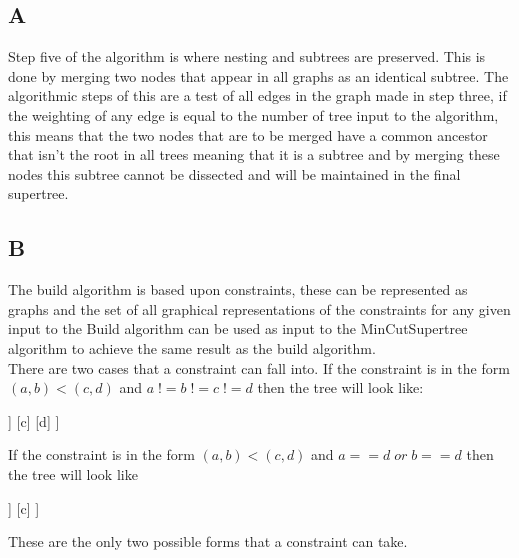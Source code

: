 \documentclass[paper=a4, fontsize=11pt]{scrartcl}
\numberwithin{equation}{section}		%
\numberwithin{figure}{section}			%
\numberwithin{table}{section}				%
\begin{document}
\iffalse
This question is about the MinCutSupertree algorithm from  C. Semple and M. Steel. A supertree method for rooted trees. Discrete Applied Mathematics
\fi

\subsection*{A}

\iffalse
One of its properties is that it preserves nesting and subtrees that are shared
by all of the input trees. Point where precisely in the algorithm this property
is achieved.
\fi

Step five of the algorithm is where nesting and subtrees are preserved. This is done by merging two nodes that appear in all graphs as an identical subtree. The algorithmic steps of this are a test of all edges in the graph made in step three, if the weighting of any edge is equal to the number of tree input to the algorithm, this means that the two nodes that are to be merged have a common ancestor that isn't the root in all trees meaning that it is a subtree and by merging these nodes this subtree cannot be dissected and will be maintained in the final supertree.

\subsection*{B}

\iffalse
Argue that the MinCutSupertree algorithm is a generalisation of the Build
algorithm, i.e. show how to encode a constraint from the inputs of the later as
a tree, which is one of the inputs of the former.
\fi

The build algorithm is based upon constraints, these can be represented as graphs and the set of all graphical representations of the constraints for any given input to the Build algorithm can be used as input to the MinCutSupertree algorithm to achieve the same result as the build algorithm.\\

There are two cases that a constraint can fall into. If the constraint is in the form $(a,b)<(c,d)$ and $a\;!=b\;!=c\;!=d$ then the tree will look like:\\
\begin{forest}
[
	[
		[a]
		[b]	
	]
	[c]
	[d]
]
\end{forest}

If the constraint is in the form $(a,b)<(c,d)$ and $a == d\;or\;b == d$ then the tree will look like

\begin{forest}
[
	[
		[a]
		[b]	
	]
	[c]
]
\end{forest}

These are the only two possible forms that a constraint can take.

\end{document}
